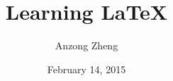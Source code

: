 \documentclass[10pt,a4paper]{book}
\begin{document}
\begin{CJK*}{UTF8}{song}
	\author{Anzong Zheng}
	\title{Learning \LaTeX}
	\date{February 14, 2015}
	\maketitle
	\newpage
	
	
	\tableofcontents
	\newpage
	
%
%
%	
%	
%	
%	
%	
%	
%	
%
%	
%	
%	
%	
%	
%	

\end{CJK*}

\end{document}
